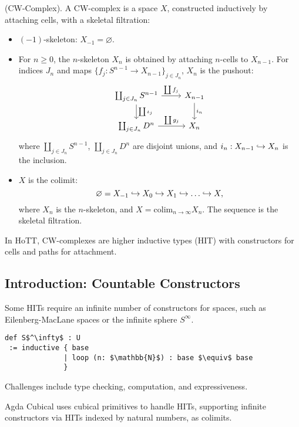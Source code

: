 \documentclass{article}
\begin{document}
\begin{definition} (CW-Complex).
A CW-complex is a space \( X \), constructed inductively by attaching cells, with a skeletal filtration:
\begin{itemize}
    \item \((-1)\)-skeleton: \( X_{-1} = \varnothing \).
    \item For \( n \geq 0 \), the $n$-skeleton \( X_n \) is obtained by attaching $n$-cells to \( X_{n-1} \). For
      indices \( J_n \) and maps \( \{ f_j : S^{n-1} \to X_{n-1}
      \}_{j \in J_n} \), \( X_n \) is the pushout:
    \[
    \begin{tikzcd}
    \coprod_{j \in J_n} S^{n-1} \arrow[r, "\coprod f_j"] \arrow[d, "\coprod \iota_j"] & X_{n-1} \arrow[d, "i_n"] \\
    \coprod_{j \in J_n} D^n \arrow[r, "\coprod g_j"] & X_n
    \end{tikzcd}
    \]
    where \( \coprod_{j \in J_n} S^{n-1} \), \( \coprod_{j \in
    J_n} D^n \) are disjoint unions, and \( i_n : X_{n-1}
    \hookrightarrow X_n \) is the inclusion.
    \item \( X \) is the colimit:
    \[
    \varnothing = X_{-1} \incmap X_0 \incmap X_1 \incmap \dots
    \incmap X,
    \]
    where \( X_n \) is the $n$-skeleton, and \( X = \text{colim}_{n
    \to \infty} X_n \). The sequence is the skeletal filtration.
\end{itemize}
In HoTT, CW-complexes are higher inductive types (HIT)
with constructors for cells and paths for attachment.
\end{definition}

\newpage
\subsection{Introduction: Countable Constructors}
Some HITs require an infinite number of constructors for spaces,
such as Eilenberg-MacLane spaces or the infinite sphere \( S^\infty \).
\begin{lstlisting}[mathescape=true]
def S$^\infty$ : U
 := inductive { base
              | loop (n: $\mathbb{N}$) : base $\equiv$ base
              }
\end{lstlisting}
Challenges include type checking, computation, and expressiveness.

Agda Cubical uses cubical primitives to handle HITs, supporting
infinite constructors via HITs indexed by natural numbers, as colimits.
\end{document}
